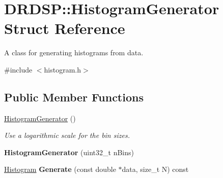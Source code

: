 \hypertarget{struct_d_r_d_s_p_1_1_histogram_generator}{\section{D\-R\-D\-S\-P\-:\-:Histogram\-Generator Struct Reference}
\label{struct_d_r_d_s_p_1_1_histogram_generator}
}


A class for generating histograms from data.  




{\ttfamily \#include $<$histogram.\-h$>$}

\subsection*{Public Member Functions}
\begin{DoxyCompactItemize}
\item 
\hypertarget{struct_d_r_d_s_p_1_1_histogram_generator_aba084569d244397f561b0f219921d296}{\hyperlink{struct_d_r_d_s_p_1_1_histogram_generator_aba084569d244397f561b0f219921d296}{Histogram\-Generator} ()}\label{struct_d_r_d_s_p_1_1_histogram_generator_aba084569d244397f561b0f219921d296}

\begin{DoxyCompactList}\small\item\em Use a logarithmic scale for the bin sizes. \end{DoxyCompactList}\item 
\hypertarget{struct_d_r_d_s_p_1_1_histogram_generator_ad8a1d610f8fb2ca15b3765d54e13885e}{{\bfseries Histogram\-Generator} (uint32\-\_\-t n\-Bins)}\label{struct_d_r_d_s_p_1_1_histogram_generator_ad8a1d610f8fb2ca15b3765d54e13885e}

\item 
\hypertarget{struct_d_r_d_s_p_1_1_histogram_generator_af1acac305990b01bc4cc6e612415bf72}{\hyperlink{struct_d_r_d_s_p_1_1_histogram}{Histogram} {\bfseries Generate} (const double $\ast$data, size\-\_\-t N) const }\label{struct_d_r_d_s_p_1_1_histogram_generator_af1acac305990b01bc4cc6e612415bf72}

\end{DoxyCompactItemize}
